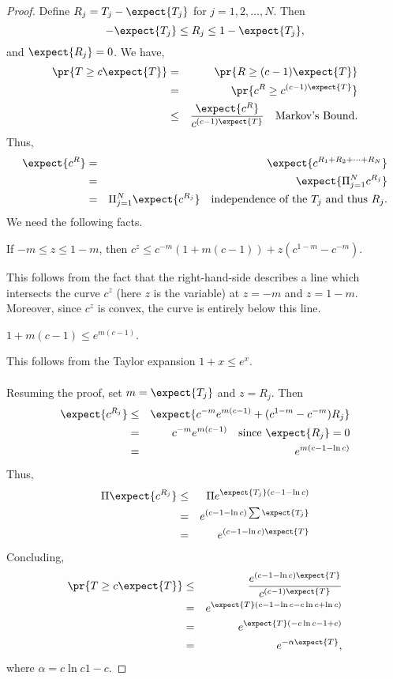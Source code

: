 \begin{proof}
\noindent Define $R_j = T_j - \expect{T_j}$ for $j = 1, 2, \ldots, N$. Then 
$$-\expect{T_j} \leq R_j \leq 1- \expect{T_j},$$
and $\expect{R_j} = 0$. We have,
\begin{eqnarray*}
\pr{T \geq c \expect{T}} & = & \pr{R \geq (c-1)\expect{T}}\\
& = & \pr{c^R \geq c^{(c-1)\expect{T}}}\\
& \leq & \frac{\expect{c^R}}{c^{(c-1)\expect{T}}} \ \ \textrm{ Markov's Bound}.
\end{eqnarray*}
Thus,
\begin{eqnarray*}
\expect{c^R} & = & \expect{c^{R_1 + R_2+ \cdots + R_N}}\\
& = & \expect{\Pi_{j=1}^N c^{R_j}}\\
& = & \Pi_{j=1}^N \expect{c^{R_j}} \ \ \textrm{ independence of the }T_j \textrm{ and thus } R_j.
\end{eqnarray*}
We need the following facts.
\begin{fact}
If $-m \leq z \leq 1-m$, then $c^z \leq c^{-m}(1 + m(c-1)) + z(c^{1-m} - c^{-m})$.
\end{fact}
This follows from the fact that the right-hand-side describes a line which intersects the curve $c^z$ (here $z$ is the variable) at $z = -m$ and $z = 1-m$. Moreover, since $c^z$ is convex, the curve is entirely below this line. 
\begin{fact}
$1 + m(c-1) \leq e^{m(c-1)}$.
\end{fact}
This follows from the Taylor expansion $1 + x \leq e^x$. 
\\\\
Resuming the proof, set $m = \expect{T_j}$ and $z = R_j$. Then
\begin{eqnarray*}
\expect{c^{R_j}} &\leq &\expect{c^{-m}e^{m(c-1)} + (c^{1-m} - c^{-m})R_j}\\
& = & c^{-m}e^{m(c-1)} \ \ \textrm{ since } \expect{R_j} = 0\\
& = & e^{m(c-1-\ln c)}
\end{eqnarray*}
Thus,
\begin{eqnarray*}
\Pi \expect{c^{R_j}} & \leq & \Pi e^{\expect{T_j}(c-1-\ln c)}\\
& = & e^{(c-1-\ln c)\sum \expect{T_j}}\\
& = & e^{(c-1-\ln c)\expect{T}}
\end{eqnarray*}
Concluding,
\begin{eqnarray*}
\pr{T \geq c\expect{T}} & \leq & \frac{e^{(c-1-\ln c)\expect{T}}}{c^{(c-1)\expect{T}}}\\
& = & e^{\expect{T}(c - 1- \ln c - c\ln c + \ln c)}\\
& = & e^{\expect{T}(-c \ln c - 1 + c)}\\
& = & e^{-\alpha \expect{T}},
\end{eqnarray*}
where $\alpha = c\ln c 1-c$.
\end{proof}

